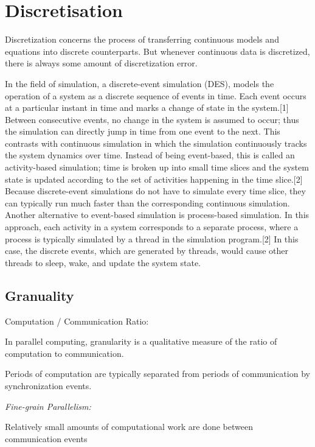\section{Discretisation}
\label{dis}

Discretization concerns the process of transferring continuous models and equations into discrete counterparts. But whenever continuous data is discretized, there is always some amount of discretization error.

In the field of simulation, a discrete-event simulation (DES), models the operation of a system as a discrete sequence of events in time. Each event occurs at a particular instant in time and marks a change of state in the system.[1] Between consecutive events, no change in the system is assumed to occur; thus the simulation can directly jump in time from one event to the next.
This contrasts with continuous simulation in which the simulation continuously tracks the system dynamics over time. Instead of being event-based, this is called an activity-based simulation; time is broken up into small time slices and the system state is updated according to the set of activities happening in the time slice.[2] Because discrete-event simulations do not have to simulate every time slice, they can typically run much faster than the corresponding continuous simulation.
Another alternative to event-based simulation is process-based simulation. In this approach, each activity in a system corresponds to a separate process, where a process is typically simulated by a thread in the simulation program.[2] In this case, the discrete events, which are generated by threads, would cause other threads to sleep, wake, and update the system state.

\subsection{Granuality}

      Computation / Communication Ratio:

          In parallel computing, granularity is a qualitative measure of the ratio of computation to communication.

          Periods of computation are typically separated from periods of communication by synchronization events.

      \emph{Fine-grain Parallelism:}

          Relatively small amounts of computational work are done between communication events

